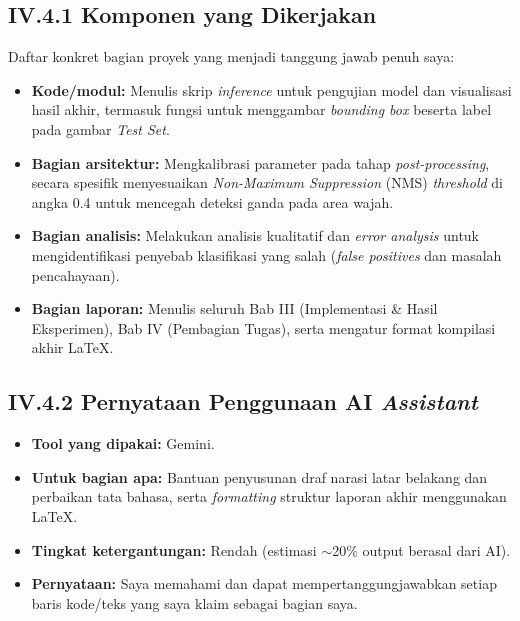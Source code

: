 \documentclass[11pt,a4paper,oneside]{report}
\begin{document}
\subsection*{IV.4.1 Komponen yang Dikerjakan}
Daftar konkret bagian proyek yang menjadi tanggung jawab penuh saya:
\begin{itemize}[leftmargin=*]
    \item \textbf{Kode/modul:} Menulis skrip \textit{inference} untuk pengujian model dan visualisasi hasil akhir, termasuk fungsi untuk menggambar \textit{bounding box} beserta label pada gambar \textit{Test Set}.
    \item \textbf{Bagian arsitektur:} Mengkalibrasi parameter pada tahap \textit{post-processing}, secara spesifik menyesuaikan \textit{Non-Maximum Suppression} (NMS) \textit{threshold} di angka 0.4 untuk mencegah deteksi ganda pada area wajah.
    \item \textbf{Bagian analisis:} Melakukan analisis kualitatif dan \textit{error analysis} untuk mengidentifikasi penyebab klasifikasi yang salah (\textit{false positives} dan masalah pencahayaan).
    \item \textbf{Bagian laporan:} Menulis seluruh Bab III (Implementasi \& Hasil Eksperimen), Bab IV (Pembagian Tugas), serta mengatur format kompilasi akhir LaTeX.
\end{itemize}

\subsection*{IV.4.2 Pernyataan Penggunaan AI \textit{Assistant}}
\begin{itemize}[leftmargin=*]
    \item \textbf{Tool yang dipakai:} Gemini.
    \item \textbf{Untuk bagian apa:} Bantuan penyusunan draf narasi latar belakang dan perbaikan tata bahasa, serta \textit{formatting} struktur laporan akhir menggunakan LaTeX.
    \item \textbf{Tingkat ketergantungan:} Rendah (estimasi $\sim$20\% output berasal dari AI).
    \item \textbf{Pernyataan:} Saya memahami dan dapat mempertanggungjawabkan setiap baris kode/teks yang saya klaim sebagai bagian saya.
\end{itemize}


\end{document}
